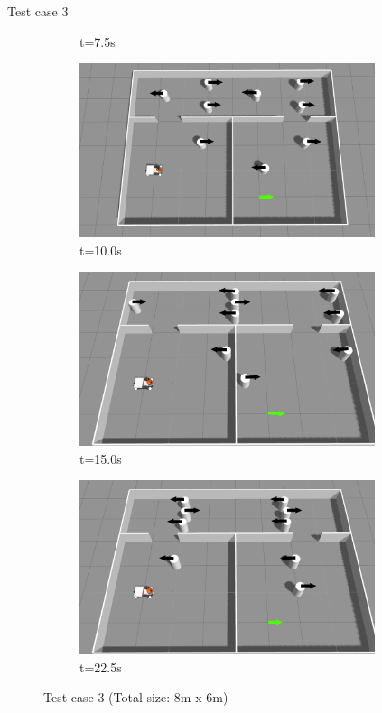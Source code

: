 \documentclass{beamer}
\begin{document}
\begin{frame}[t]{\huge{Test case 3}}
\begin{figure}[H]
\begin{subfigure}[b]{0.35\linewidth}
        \caption{t=7.5s}
    \end{subfigure}
    \begin{subfigure}[b]{0.35\linewidth}
        \centering
        \includegraphics[width=0.95\textwidth]{../report/images/test_case_3/mid2.png}
        \caption{t=10.0s}
    \end{subfigure}%
    \begin{subfigure}[b]{0.35\linewidth}
        \centering
        \includegraphics[width=0.95\textwidth]{../report/images/test_case_3/exp3.png}
        \caption{t=15.0s}
    \end{subfigure}%
    \begin{subfigure}[b]{0.35\linewidth}
        \centering
        \includegraphics[width=0.95\textwidth]{../report/images/test_case_3/exp4.png}
        \caption{t=22.5s}
    \end{subfigure}
    \caption{Test case 3 (Total size: 8m x 6m)}\label{fig:double_room}
\end{figure}
\end{frame}
\end{document}
